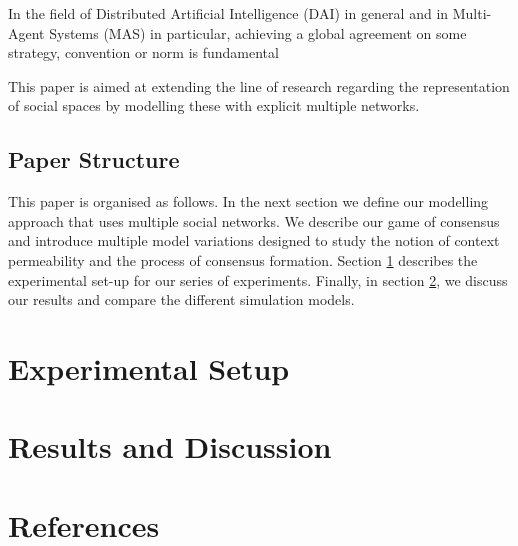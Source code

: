 \documentclass[preprint,number]{elsarticle}
\begin{document}




In the field of Distributed Artificial Intelligence (DAI) in general and in Multi-Agent Systems (MAS) in particular, achieving a global agreement on some strategy, convention or norm is fundamental 
\cite{Delgado2002}





This paper is aimed at extending the line of research regarding the representation of social spaces by modelling these with explicit multiple networks.



\subsection{Paper Structure}
This paper is organised as follows. In the next section we define our modelling approach that uses multiple social networks. We describe our game of consensus and introduce multiple model variations designed to study the notion of context permeability and the process of consensus formation. Section \ref{sec:experimental-setup} describes the experimental set-up for our series of experiments. Finally, in section \ref{sec:results-discussion}, we discuss our results and compare the different simulation models.



\section{Experimental Setup}
\label{sec:experimental-setup}

\section{Results and Discussion}
\label{sec:results-discussion}



\section*{References}


\end{document}
